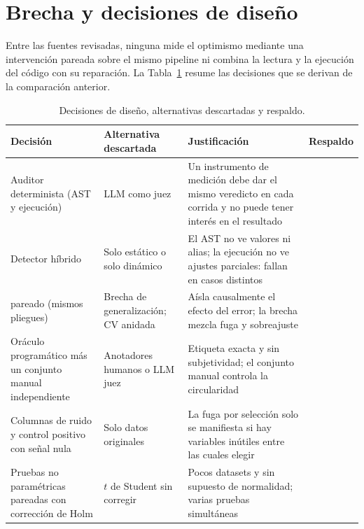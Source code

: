 \section{Brecha y decisiones de diseño}

Entre las fuentes revisadas, ninguna mide el optimismo mediante una intervención pareada sobre el mismo pipeline ni combina la lectura y la ejecución del código con su reparación. La Tabla~\ref{tab:decisiones} resume las decisiones que se derivan de la comparación anterior.

\begin{table}[!htbp]
\centering
\caption{Decisiones de diseño, alternativas descartadas y respaldo.}
\label{tab:decisiones}
\begingroup\scriptsize\singlespacing
\begin{tabular}{@{}p{3.0cm} p{3.4cm} p{6.0cm} p{2.4cm}@{}}
\toprule
Decisión & Alternativa descartada & Justificación & Respaldo \\
\midrule
Auditor determinista (AST y ejecución) & LLM como juez & Un instrumento de medición debe dar el mismo veredicto en cada corrida y no puede tener interés en el resultado & \textcite{zheng2023} \\
Detector híbrido & Solo estático o solo dinámico & El AST no ve valores ni alias; la ejecución no ve ajustes parciales: fallan en casos distintos & \textcite{yang2022} \\
\DOpt{} pareado (mismos pliegues) & Brecha de generalización; CV anidada & Aísla causalmente el efecto del error; la brecha mezcla fuga y sobreajuste & \textcite{kapoor2023,cawley2010} \\
Oráculo programático más un conjunto manual independiente & Anotadores humanos o LLM juez & Etiqueta exacta y sin subjetividad; el conjunto manual controla la circularidad & \textcite{hevner2004} \\
Columnas de ruido y control positivo con señal nula & Solo datos originales & La fuga por selección solo se manifiesta si hay variables inútiles entre las cuales elegir & \textcite{ambroise2002} \\
Pruebas no paramétricas pareadas con corrección de Holm & $t$ de Student sin corregir & Pocos datasets y sin supuesto de normalidad; varias pruebas simultáneas & \textcite{demsar2006,holm1979} \\
\bottomrule
\end{tabular}
\endgroup
\end{table}
